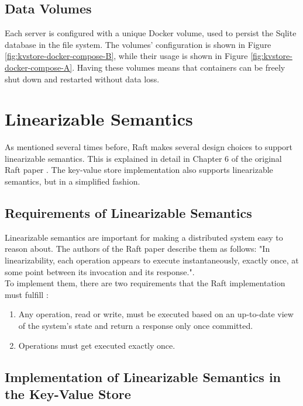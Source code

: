 \subsection{Data Volumes}

Each server is configured with a unique Docker volume, used to persist the Sqlite database in the file system. The volumes' configuration is shown in Figure \ref{fig:kvstore-docker-compose-B}, while their usage is shown in Figure \ref{fig:kvstore-docker-compose-A}. Having these volumes means that containers can be freely shut down and restarted without data loss.

\section{Linearizable Semantics} \label{linearizable-semantics}

As mentioned several times before, Raft makes several design choices to support linearizable semantics. This is explained in detail in Chapter 6 of the original Raft paper \cite{raft}. The key-value store implementation also supports linearizable semantics, but in a simplified fashion.

\subsection{Requirements of Linearizable Semantics}

Linearizable semantics are important for making a distributed system easy to reason about. The authors of the Raft paper describe them as follows: "In linearizability, each operation appears to execute instantaneously, exactly once, at some
point between its invocation and its response."\cite{raft}.\\

To implement them, there are two requirements that the Raft implementation must fulfill \cite{raft}: 
\begin{enumerate}
    \item Any operation, read or write, must be executed based on an up-to-date view of the system's state and return a response only once committed.
    \item Operations must get executed exactly once.
\end{enumerate}

\subsection{Implementation of Linearizable Semantics in the Key-Value Store}

